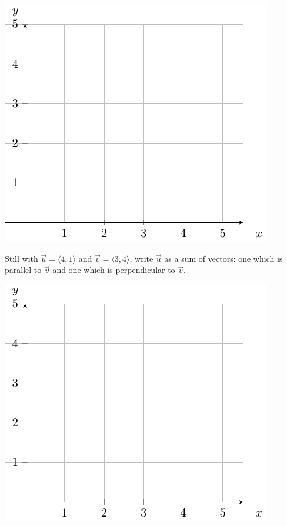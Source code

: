 \includegraphics[scale=.8]{tikz-pictures/section-9.2-pic4-axes-for-projection-example.pdf}

\pagebreak 
\begin{ex}
    Still with $\vec{u}=\langle 4,1\rangle$ and $\vec{v}=\langle 3,4\rangle$, write $\vec{u}$ as a sum of vectors: one which is parallel to $\vec{v}$ and one which is perpendicular to $\vec{v}$.
\end{ex}
\includegraphics[scale=.8]{tikz-pictures/section-9.2-pic4-axes-for-projection-example.pdf}

